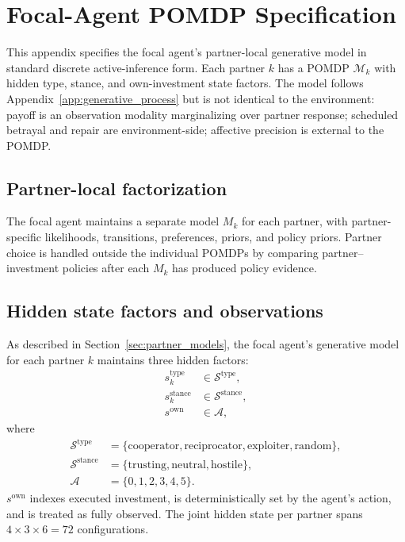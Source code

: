 \section{Focal-Agent POMDP Specification}
\label{app:pomdp}

This appendix specifies the focal agent's partner-local generative model in standard discrete active-inference form. Each partner \(k\) has a POMDP \(\mathcal{M}_k\) with hidden type, stance, and own-investment state factors. The model follows Appendix~\ref{app:generative_process} but is not identical to the environment: payoff is an observation modality marginalizing over partner response; scheduled betrayal and repair are environment-side; affective precision is external to the POMDP.

\subsection{Partner-local factorization}

The focal agent maintains a separate model \(M_k\) for each partner, with partner-specific likelihoods, transitions, preferences, priors, and policy priors. Partner choice is handled outside the individual POMDPs by comparing partner--investment policies after each \(M_k\) has produced policy evidence.

\subsection{Hidden state factors and observations}

As described in Section~\ref{sec:partner_models}, the focal agent's generative model for each partner $k$ maintains three hidden factors:
\begin{align}
s_k^{\text{type}} &\in \mathcal{S}^{\text{type}}, \label{eq:s_type} \\
s_k^{\text{stance}} &\in \mathcal{S}^{\text{stance}}, \label{eq:s_stance} \\
s^{\mathrm{own}} &\in \mathcal{A}, \nonumber
\end{align}
where
\begin{align*}
\mathcal{S}^{\text{type}} &= \{\mathrm{cooperator},\mathrm{reciprocator},\mathrm{exploiter},\mathrm{random}\}, \\
\mathcal{S}^{\text{stance}} &= \{\mathrm{trusting},\mathrm{neutral},\mathrm{hostile}\}, \\
\mathcal{A} &= \{0,1,2,3,4,5\}.
\end{align*}
\(s^{\mathrm{own}}\) indexes executed investment, is deterministically set by the agent's action, and is treated as fully observed. The joint hidden state per partner spans \(4\times3\times6=72\) configurations.

